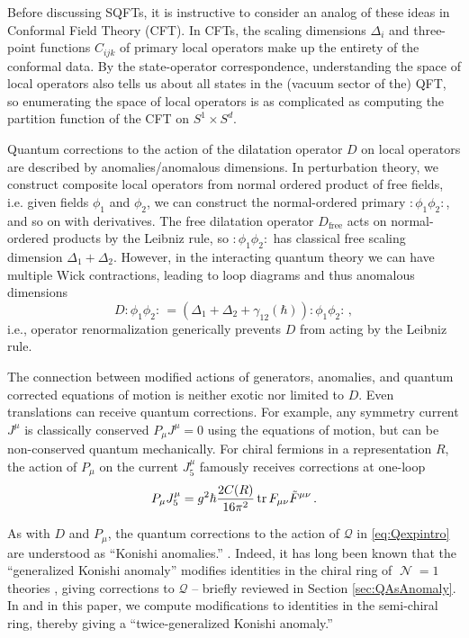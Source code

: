 \documentclass[11pt]{article}
\DeclareMathOperator{\calN}{\mathcal{N}}
\DeclareMathOperator{\free}{{\mathrm{free}}}
\renewcommand{\bm}{\mathcal}
\begin{document}
   
Before discussing SQFTs, it is instructive to consider an analog of these ideas in Conformal Field Theory (CFT). In CFTs, the scaling dimensions $\Delta_i$ and three-point functions $C_{ijk}$ of primary local operators make up the entirety of the conformal data. By the state-operator correspondence, understanding the space of local operators also tells us about all states in the (vacuum sector of the) QFT, so enumerating the space of local operators is as complicated as computing the partition function of the CFT on $S^1 \times S^d$.

Quantum corrections to the action of the dilatation operator $D$ on local operators are described by anomalies/anomalous dimensions. In perturbation theory, we construct composite local operators from normal ordered product of free fields, i.e. given fields $\phi_1$ and $\phi_2$, we can construct the normal-ordered primary $:\!\!\phi_1\phi_2\!\!:$, and so on with derivatives. The free dilatation operator $D_{\free}$ acts on normal-ordered products by the Leibniz rule, so $:\!\!\phi_1\phi_2\!\!:$ has classical free scaling dimension $\Delta_1 + \Delta_2$. However, in the interacting quantum theory we can have multiple Wick contractions, leading to loop diagrams and thus anomalous dimensions
\begin{equation}
    D\!:\!\!\phi_1\phi_2\!\!: \,= (\Delta_1 + \Delta_2 + \gamma_{12}(\hbar))\!:\!\!\phi_1\phi_2\!\!: \,,
\end{equation}
i.e., operator renormalization generically prevents $D$ from acting by the Leibniz rule. 

The connection between modified actions of generators, anomalies, and quantum corrected equations of motion is neither exotic nor limited to $D$. Even translations can receive quantum corrections. For example, any symmetry current $J^\mu$ is classically conserved $P_\mu J^\mu = 0$ using the equations of motion, but can be non-conserved quantum mechanically. For chiral fermions in a representation $R$, the action of $P_\mu$ on the current $J_5^\mu$ famously receives corrections at one-loop
\begin{equation}\label{eq:chiralAnomaly}
    P_\mu J_{5}^\mu = g^2 \hbar \frac{2C(R)}{16\pi^2} \tr F_{\mu\nu} \tilde{F}^{\mu\nu}\,.
\end{equation}


As with $D$ and $P_\mu$, the quantum corrections to the action of $\bm{Q}$ in \eqref{eq:Qexpintro} are understood as ``Konishi anomalies.'' \cite{Konishi:1983hf, Konishi:1985tu}. Indeed, it has long been known that the ``generalized Konishi anomaly'' modifies identities in the chiral ring of $\calN=1$ theories \cite{CDSW}, giving corrections to $\bm{Q}$ -- briefly reviewed in Section \ref{sec:QAsAnomaly}. In \cite{Budzik:2023xbr} and in this paper, we compute modifications to identities in the semi-chiral ring, thereby giving a ``twice-generalized Konishi anomaly.''
\end{document}

